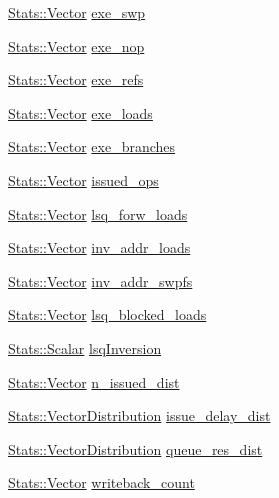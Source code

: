 \begin{DoxyCompactItemize}
\item 
\hyperlink{classStats_1_1Vector}{Stats::Vector} \hyperlink{classBackEnd_a7d82b30a9bc5daa8a508aad6120df60a}{exe\_\-swp}
\item 
\hyperlink{classStats_1_1Vector}{Stats::Vector} \hyperlink{classBackEnd_a16327b5e9165d27dc47c0bf44238cd74}{exe\_\-nop}
\item 
\hyperlink{classStats_1_1Vector}{Stats::Vector} \hyperlink{classBackEnd_a9c0474dab97b001394a40aed972f827a}{exe\_\-refs}
\item 
\hyperlink{classStats_1_1Vector}{Stats::Vector} \hyperlink{classBackEnd_a07f469c547d380cda882b5ca10fc8813}{exe\_\-loads}
\item 
\hyperlink{classStats_1_1Vector}{Stats::Vector} \hyperlink{classBackEnd_a2bffb8fee3fa396523a2b86dba12a606}{exe\_\-branches}
\item 
\hyperlink{classStats_1_1Vector}{Stats::Vector} \hyperlink{classBackEnd_ad98215aa24a0390cc2ba2234f272cb17}{issued\_\-ops}
\item 
\hyperlink{classStats_1_1Vector}{Stats::Vector} \hyperlink{classBackEnd_afcc98cdfa47d5d6cfd8818f91dde0eb5}{lsq\_\-forw\_\-loads}
\item 
\hyperlink{classStats_1_1Vector}{Stats::Vector} \hyperlink{classBackEnd_a032ab6d2dd14a8ccff4d407c7ff2a3d9}{inv\_\-addr\_\-loads}
\item 
\hyperlink{classStats_1_1Vector}{Stats::Vector} \hyperlink{classBackEnd_a3814f636ed4028691262652be79c7091}{inv\_\-addr\_\-swpfs}
\item 
\hyperlink{classStats_1_1Vector}{Stats::Vector} \hyperlink{classBackEnd_afdabbae5f4752ae636610a296ce040e6}{lsq\_\-blocked\_\-loads}
\item 
\hyperlink{classStats_1_1Scalar}{Stats::Scalar} \hyperlink{classBackEnd_abf96f4acba126fbcf919829a1125954c}{lsqInversion}
\item 
\hyperlink{classStats_1_1Vector}{Stats::Vector} \hyperlink{classBackEnd_aef7967289461e66d515723da65e1f9f7}{n\_\-issued\_\-dist}
\item 
\hyperlink{classStats_1_1VectorDistribution}{Stats::VectorDistribution} \hyperlink{classBackEnd_acbff26ed63b17948662f090985d17d32}{issue\_\-delay\_\-dist}
\item 
\hyperlink{classStats_1_1VectorDistribution}{Stats::VectorDistribution} \hyperlink{classBackEnd_a6737d38b89983fe331764c5c0edfbe12}{queue\_\-res\_\-dist}
\item 
\hyperlink{classStats_1_1Vector}{Stats::Vector} \hyperlink{classBackEnd_a1b89675ac5b779ab9ead5ae5d3550189}{writeback\_\-count}

\end{DoxyCompactItemize}

